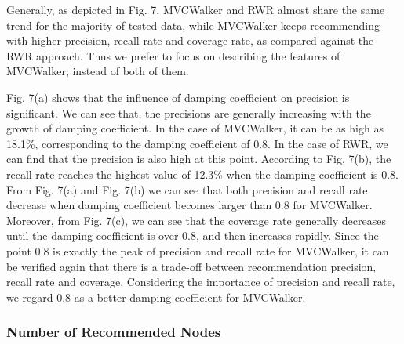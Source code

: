 \documentclass[10pt,journal,compsoc]{IEEEtran}
\begin{document}
Generally, as depicted in Fig. 7, MVCWalker and RWR almost share the same trend for the majority of tested data, while MVCWalker keeps recommending with higher precision, recall rate and coverage rate, as compared against the RWR approach. Thus we prefer to focus on describing the features of MVCWalker, instead of both of them.

Fig. 7(a) shows that the influence of damping coefficient on precision is significant. We can see that, the precisions are generally increasing with the growth of damping coefficient. In the case of MVCWalker, it can be as high as 18.1\%, corresponding to the damping coefficient of 0.8. In the case of RWR, we can find that the precision is also high at this point. According to Fig. 7(b), the recall rate reaches the highest value of 12.3\% when the damping coefficient is 0.8. From Fig. 7(a) and Fig. 7(b) we can see that both precision and recall rate decrease when damping coefficient becomes larger than 0.8 for MVCWalker. Moreover, from Fig. 7(c), we can see that the coverage rate generally decreases until the damping coefficient is over 0.8, and then increases rapidly. Since the point 0.8 is exactly the peak of precision and recall rate for MVCWalker, it can be verified again that there is a trade-off between recommendation precision, recall rate and coverage. Considering the importance of precision and recall rate, we regard 0.8 as a better damping coefficient for MVCWalker.

\subsubsection{Number of Recommended Nodes}
\end{document}
